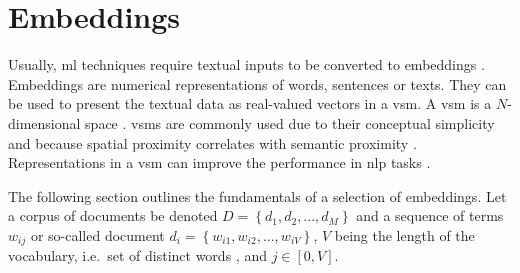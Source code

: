 \section{Embeddings}\label{sec:embeddings}

Usually, \ac{ml} techniques require textual inputs to be converted to embeddings \cite{SentRep2014}.
Embeddings are numerical representations of words, sentences or texts.
They can be used to present the textual data as real-valued vectors in a \ac{vsm}.
A \ac{vsm} is a $N$-dimensional space \cite{soft_cosine2014}.
\acp{vsm} are commonly used due to their conceptual simplicity and because spatial proximity correlates with semantic proximity 
\cite{tfidf2008, UniversalSentEnc2018, HfsentTrans2019, Top2Vec2020}.
Representations in a \ac{vsm} can improve the performance in \ac{nlp} tasks \cite{SkipGram2013}.

The following section outlines the fundamentals of a selection of embeddings.
Let a corpus of documents be denoted $D= \left\{d_1, d_2, ..., d_M  \right\}$ 
and a sequence of terms $w_{ij}$ or so-called document $d_i = \left\{w_{i1}, w_{i2}, ..., w_{iV}  \right\}$, 
$V$ being the length of the vocabulary, 
i.e.\ set of distinct words \cite{clusteringDocs2020}, and $j \in [0, V]$.











